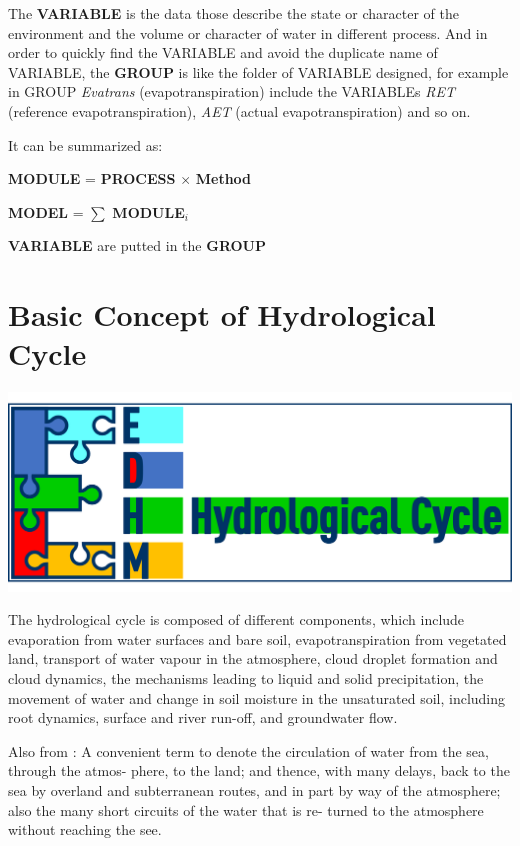 \documentclass[
]{book}
\begin{document}
The \textbf{VARIABLE} is the data those describe the state or character of the environment and the volume or character of water in different process. And in order to quickly find the VARIABLE and avoid the duplicate name of VARIABLE, the \textbf{GROUP} is like the folder of VARIABLE designed, for example in GROUP \emph{Evatrans} (evapotranspiration) include the VARIABLEs \emph{RET} (reference evapotranspiration), \emph{AET} (actual evapotranspiration) and so on.

It can be summarized as:

\textbf{MODULE} = \textbf{PROCESS} \(\times\) \textbf{Method}

\textbf{MODEL} = \(\sum\) \textbf{MODULE}\(_i\)

\textbf{VARIABLE} are putted in the \textbf{GROUP}

\hypertarget{basic-concept-of-hydrological-cycle}{%
\section{Basic Concept of Hydrological Cycle}\label{basic-concept-of-hydrological-cycle}}

\includegraphics{fig/EDHM_cycle.png}

The hydrological cycle is composed of different components, which include evaporation from water surfaces and bare soil, evapotranspiration from vegetated land, transport of water vapour in the atmosphere, cloud droplet formation and cloud dynamics, the mechanisms leading to liquid and solid precipitation, the movement of water and change in soil moisture in the unsaturated soil, including root dynamics, surface and river run-off, and groundwater flow.\citep{Rast.2014}

Also from \citep{LANGBEIN.1960}: A convenient term to denote the circulation of water from the sea, through the atmos- phere, to the land; and thence, with many delays, back to the sea by overland and subterranean routes, and in part by way of the atmosphere; also the many short circuits of the water that is re- turned to the atmosphere without reaching the see.
\end{document}
